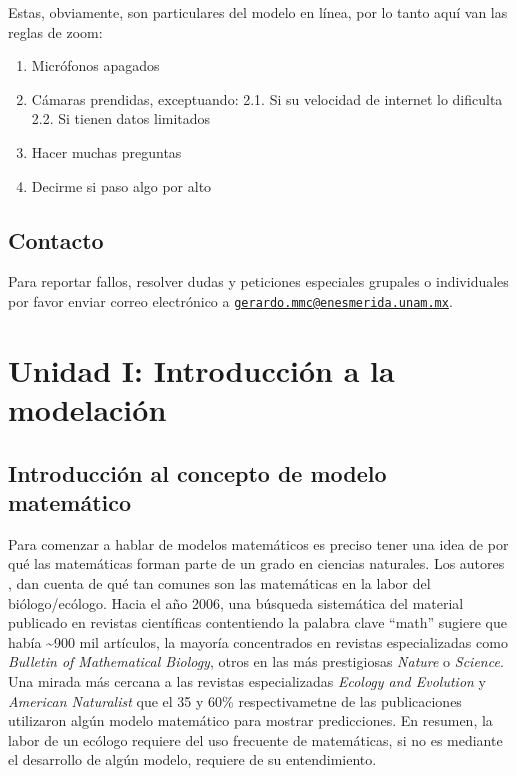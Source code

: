 \documentclass[
]{book}
\providecommand{\tightlist}{%
  \setlength{\itemsep}{0pt}\setlength{\parskip}{0pt}}
\begin{document}
Estas, obviamente, son particulares del modelo en línea, por lo tanto aquí van las reglas de zoom:

\begin{enumerate}
\def\labelenumi{\arabic{enumi}.}
\tightlist
\item
  Micrófonos apagados
\item
  Cámaras prendidas, exceptuando:
  2.1. Si su velocidad de internet lo dificulta
  2.2. Si tienen datos limitados
\item
  Hacer muchas preguntas
\item
  Decirme si paso algo por alto
\end{enumerate}

\hypertarget{contacto}{%
\section{Contacto}\label{contacto}}

Para reportar fallos, resolver dudas y peticiones especiales grupales o individuales por favor enviar correo electrónico a \href{mailto:gerardo.mmc@enesmerida.unam.mx}{\nolinkurl{gerardo.mmc@enesmerida.unam.mx}}.

\hypertarget{unidad-i-introducciuxf3n-a-la-modelaciuxf3n}{%
\chapter{Unidad I: Introducción a la modelación}\label{unidad-i-introducciuxf3n-a-la-modelaciuxf3n}}

\hypertarget{introducciuxf3n-al-concepto-de-modelo-matemuxe1tico}{%
\section{Introducción al concepto de modelo matemático}\label{introducciuxf3n-al-concepto-de-modelo-matemuxe1tico}}

Para comenzar a hablar de modelos matemáticos es preciso tener una idea de por qué las matemáticas forman parte de un grado en ciencias naturales. Los autores \citet{otto2011biologist}, dan cuenta de qué tan comunes son las matemáticas en la labor del biólogo/ecólogo. Hacia el año 2006, una búsqueda sistemática del material publicado en revistas científicas contentiendo la palabra clave ``math'' sugiere que había \textasciitilde900 mil artículos, la mayoría concentrados en revistas especializadas como \emph{Bulletin of Mathematical Biology}, otros en las más prestigiosas \emph{Nature} o \emph{Science}. Una mirada más cercana a las revistas especializadas \emph{Ecology and Evolution} y \emph{American Naturalist} que el 35 y 60\% respectivametne de las publicaciones utilizaron algún modelo matemático para mostrar predicciones. En resumen, la labor de un ecólogo requiere del uso frecuente de matemáticas, si no es mediante el desarrollo de algún modelo, requiere de su entendimiento.
\end{document}
